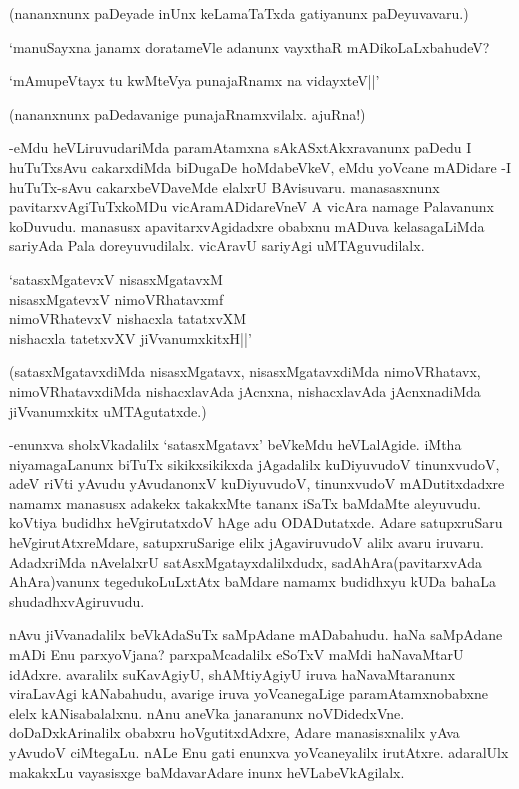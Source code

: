 (nananxnunx paDeyade inUnx keLamaTaTxda gatiyanunx paDeyuvavaru.)

`manuSayxna janamx doratameVle adanunx vayxthaR mADikoLaLxbahudeV?

\begin{shloka}
`mAmupeVtayx tu kwMteVya punajaRnamx na vidayxteV||'
\end{shloka}

(nananxnunx paDedavanige punajaRnamxvilalx. ajuRna!)

-eMdu heVLiruvudariMda paramAtamxna sAkASxtAkxravanunx paDedu I huTuTxsAvu cakarxdiMda biDugaDe hoMdabeVkeV, eMdu yoVcane mADidare -I huTuTx-sAvu cakarxbeVDaveMde elalxrU BAvisuvaru. manasasxnunx pavitarxvAgiTuTxkoMDu vicAramADidareVneV A vicAra namage Palavanunx koDuvudu. manasusx apavitarxvAgidadxre obabxnu mADuva kelasagaLiMda sariyAda Pala doreyuvudilalx. vicAravU sariyAgi uMTAguvudilalx.

\begin{shloka}
`satasxMgatevxV nisasxMgatavxM\\
nisasxMgatevxV nimoVRhatavxmf\\
nimoVRhatevxV nishacxla tatatxvXM\\
nishacxla tatetxvXV jiVvanumxkitxH||'
\end{shloka}

(satasxMgatavxdiMda nisasxMgatavx, nisasxMgatavxdiMda nimoVRhatavx, nimoVRhatavxdiMda nishacxlavAda jAcnxna, nishacxlavAda jAcnxnadiMda jiVvanumxkitx uMTAgutatxde.)

-enunxva sholxVkadalilx `satasxMgatavx' beVkeMdu heVLalAgide. iMtha niyamagaLanunx biTuTx sikikxsikikxda jAgadalilx kuDiyuvudoV tinunxvudoV, adeV riVti yAvudu yAvudanonxV kuDiyuvudoV, tinunxvudoV mADutitxdadxre namamx manasusx adakekx takakxMte tananx iSaTx baMdaMte aleyuvudu. koVtiya budidhx heVgirutatxdoV hAge adu ODADutatxde. Adare satupxruSaru heVgirutAtxreMdare, satupxruSarige elilx jAgaviruvudoV alilx avaru iruvaru. AdadxriMda nAvelalxrU satAsxMgatayxdalilxdudx, sadAhAra(pavitarxvAda AhAra)vanunx tegedukoLuLxtAtx baMdare namamx budidhxyu kUDa bahaLa shudadhxvAgiruvudu.

nAvu jiVvanadalilx beVkAdaSuTx saMpAdane mADabahudu. haNa saMpAdane mADi Enu parxyoVjana? parxpaMcadalilx eSoTxV maMdi haNavaMtarU idAdxre. avaralilx suKavAgiyU, shAMtiyAgiyU iruva haNavaMtaranunx viraLavAgi kANabahudu, avarige iruva yoVcanegaLige paramAtamxnobabxne elelx kANisabalalxnu. nAnu aneVka janaranunx noVDidedxVne. doDaDxkArinalilx obabxru hoVgutitxdAdxre, Adare manasisxnalilx yAva yAvudoV ciMtegaLu. nALe Enu gati enunxva yoVcaneyalilx irutAtxre. adaralUlx makakxLu vayasisxge baMdavarAdare inunx heVLabeVkAgilalx.

